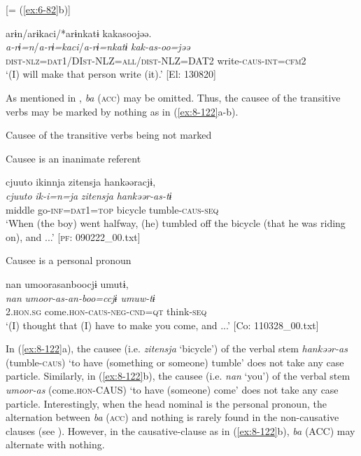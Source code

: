 \ea\label{ex:8-121}
  {}[= (\ref{ex:6-82}b)]

  {\TM}
\glll  arɨn/arɨkaci/*arɨnkatɨ  kakasoojəə.\\
\textit{a-rɨ=n}/\textit{a-rɨ=kaci}/\textit{a-rɨ=nkatɨ}  \textit{kak-as-oo=jəə}\\
    \textsc{dist}-\textsc{nlz}=\textsc{dat1}/DI\textsc{st}-NLZ=\textsc{all}/\textsc{dist}-NLZ=DAT2  write-\textsc{caus}-\textsc{int}=\textsc{cfm2}\\
\glt ‘(I) will make that person write (it).’ [El: 130820]
\z


  As mentioned in , \textit{ba} (\textsc{acc}) may be omitted. Thus, the causee of the transitive verbs may be marked by nothing as in (\ref{ex:8-122}a-b).

\ea\label{ex:8-122}
  Causee of the transitive verbs being not marked

\ea Causee is an inanimate referent

  {\TM}
\glll  cjuuto  ikinnja  {\textbar}zitensja{\textbar}  hankəəracjɨ,\\
\textit{cjuuto}  \textit{ik-i=n=ja}  \textit{zitensja}  \textit{hankəər-as-tɨ}\\
    middle  go-\textsc{inf}=\textsc{dat1}=\textsc{top}  bicycle  tumble-\textsc{caus}-\textsc{seq}\\
\glt ‘When (the boy) went halfway, (he) tumbled off the bicycle (that he was riding on), and ...’ [\textsc{pf}: 090222\_00.txt]


\ex Causee is a personal pronoun

  {\TM}
\glll  nan  umoorasanboocjɨ  umutɨ,\\
\textit{nan}  \textit{umoor-as-an-boo=ccjɨ  umuw-tɨ}\\
    2.\textsc{hon}.\textsc{sg}  come.\textsc{hon}-\textsc{caus}-\textsc{neg}-\textsc{cnd}=\textsc{qt}  think-\textsc{seq}\\
\glt ‘(I) thought that (I) have to make you come, and ...’ [Co: 110328\_00.txt]
\z
\z

In (\ref{ex:8-122}a), the causee (i.e. \textit{zitensja} ‘bicycle’) of the verbal stem \textit{hankəər-as} (tumble-\textsc{caus}) ‘to have (something or someone) tumble’ does not take any case particle. Similarly, in (\ref{ex:8-122}b), the causee (i.e. \textit{nan} ‘you’) of the verbal stem \textit{umoor-as} (come.\textsc{hon}-CAUS) ‘to have (someone) come’ does not take any case particle. Interestingly, when the head nominal is the personal pronoun, the alternation between \textit{ba} (\textsc{acc}) and nothing is rarely found in the non-causative clauses (see ). However, in the causative-clause as in (\ref{ex:8-122}b), \textit{ba} (ACC) may alternate with nothing.

